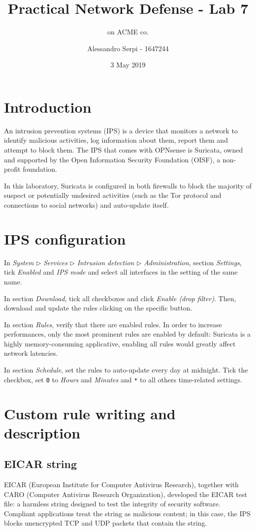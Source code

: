 \documentclass[draft]{homework}
\title{Practical Network Defense - Lab 7}
\subtitle{\suri on ACME co.}
\author{Alessandro Serpi - 1647244}
\date{3 May 2019}
\newcommand{\opn}{OPNsense\xspace}
\newcommand{\suri}{Suricata\xspace}
\begin{document}
    \maketitle
    \tableofcontents
    
    
    \pagebreak
    \section{Introduction}
    An intrusion prevention systems (IPS) is a device that monitors a network to identify malicious activities, log information about them, report them and attempt to block them.
    The IPS that comes with \opn is \suri, owned and supported by the Open Information Security Foundation (OISF), a non-profit foundation.
    
    In this laboratory, \suri is configured in both firewalls to block the majority of suspect or potentially undesired activities (such as the Tor protocol and connections to social networks) and auto-update itself.
    
    
    \section{IPS configuration}
    In \textit{System} $\triangleright$ \textit{Services} $\triangleright$ \textit{Intrusion detection} $\triangleright$ \textit{Administration}, section \textit{Settings}, tick \textit{Enabled} and \textit{IPS mode} and select all interfaces in the setting of the same name.
    
    In section \textit{Download}, tick all checkboxes and click \textit{Enable (drop filter)}. Then, download and update the rules clicking on the specific button.
    
    In section \textit{Rules}, verify that there are enabled rules.
    In order to increase performances, only the most prominent rules are enabled by default: \suri is a highly memory-consuming applicative, enabling all rules would greatly affect network latencies.
    
    In section \textit{Schedule}, set the rules to auto-update every day at midnight.
    Tick the checkbox, set \texttt{0} to \textit{Hours} and \textit{Minutes} and \texttt{*} to all others time-related settings.
    
    
    \section{Custom rule writing and description}
    \subsection{EICAR string}
    EICAR (European Institute for Computer Antivirus Research), together with CARO (Computer Antivirus Research Organization), developed the EICAR test file: a harmless string designed to test the integrity of security software.
    Compliant applications treat the string as malicious content; in this case, the IPS blocks unencrypted TCP and UDP packets that contain the string.
    
\end{document}
